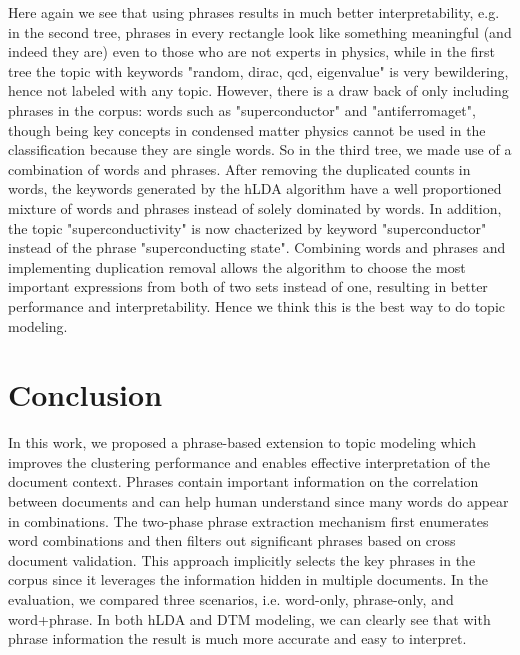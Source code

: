 \documentclass[DIV=calc, paper=letter, fontsize=10pt, twocolumn]{scrartcl}	 %
\begin{document}
Here again we see that using phrases results in much better interpretability, e.g. in the second tree, phrases in every rectangle look like something meaningful (and indeed they are) even to those who are not experts in physics, while in the first tree the topic with keywords "random, dirac, qcd, eigenvalue" is very bewildering, hence not labeled with any topic. However, there is a draw back of only including phrases in the corpus: words such as "superconductor" and "antiferromaget", though being key concepts in condensed matter physics cannot be used in the classification because they are single words. So in the third tree, we made use of a combination of words and phrases. After removing the duplicated counts in words, the keywords generated by the hLDA algorithm have a well proportioned mixture of words and phrases instead of solely dominated by words. In addition, the topic "superconductivity" is now chacterized by keyword "superconductor" instead of the phrase "superconducting state". Combining words and phrases and implementing duplication removal allows the algorithm to choose the most important expressions from both of two sets instead of one, resulting in better performance and interpretability. Hence we think this is the best way to do topic modeling.


\section*{Conclusion}
In this work, we proposed a phrase-based extension to topic modeling which improves the clustering performance and enables effective interpretation of the document context. Phrases contain important information on the correlation between documents and can help human understand since many words do appear in combinations. The two-phase phrase extraction mechanism first enumerates word combinations and then filters out significant phrases based on cross document validation. This approach implicitly selects the key phrases in the corpus since it leverages the information hidden in multiple documents. In the evaluation, we compared three scenarios, i.e. word-only, phrase-only, and word+phrase. In both hLDA and DTM modeling, we can clearly see that with phrase information the result is much more accurate and easy to interpret.

\end{document}
